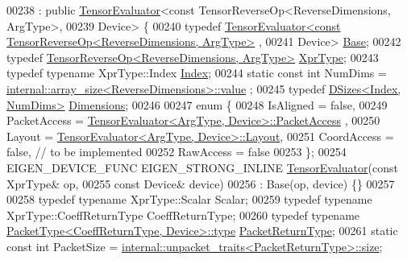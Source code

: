 \begin{DoxyCode}
00238     : \textcolor{keyword}{public} \hyperlink{struct_eigen_1_1_tensor_evaluator}{TensorEvaluator}<const TensorReverseOp<ReverseDimensions, ArgType>,
00239                              Device> \{
00240   \textcolor{keyword}{typedef} \hyperlink{struct_eigen_1_1_tensor_evaluator}{TensorEvaluator<const TensorReverseOp<ReverseDimensions, ArgType>}
      ,
00241                           Device> \hyperlink{struct_eigen_1_1_tensor_evaluator_3_01const_01_tensor_reverse_op_3_01_reverse_dimensions_00_01_arg_type_01_4_00_01_device_01_4}{Base};
00242   \textcolor{keyword}{typedef} \hyperlink{class_eigen_1_1_tensor_reverse_op}{TensorReverseOp<ReverseDimensions, ArgType>} 
      \hyperlink{class_eigen_1_1_tensor_reverse_op}{XprType};
00243   \textcolor{keyword}{typedef} \textcolor{keyword}{typename} XprType::Index \hyperlink{namespace_eigen_a62e77e0933482dafde8fe197d9a2cfde}{Index};
00244   \textcolor{keyword}{static} \textcolor{keyword}{const} \textcolor{keywordtype}{int} NumDims = \hyperlink{struct_eigen_1_1internal_1_1array__size}{internal::array\_size<ReverseDimensions>::value}
      ;
00245   \textcolor{keyword}{typedef} \hyperlink{struct_eigen_1_1_d_sizes}{DSizes<Index, NumDims>} \hyperlink{struct_eigen_1_1_d_sizes}{Dimensions};
00246 
00247   \textcolor{keyword}{enum} \{
00248     IsAligned = \textcolor{keyword}{false},
00249     PacketAccess = \hyperlink{struct_eigen_1_1_tensor_evaluator}{TensorEvaluator<ArgType, Device>::PacketAccess}
      ,
00250     Layout = \hyperlink{struct_eigen_1_1_tensor_evaluator}{TensorEvaluator<ArgType, Device>::Layout},
00251     CoordAccess = \textcolor{keyword}{false},  \textcolor{comment}{// to be implemented}
00252     RawAccess = \textcolor{keyword}{false}
00253   \};
00254   EIGEN\_DEVICE\_FUNC EIGEN\_STRONG\_INLINE \hyperlink{struct_eigen_1_1_tensor_evaluator}{TensorEvaluator}(\textcolor{keyword}{const} XprType& op,
00255                                                         \textcolor{keyword}{const} Device& device)
00256       : Base(op, device) \{\}
00257 
00258   \textcolor{keyword}{typedef} \textcolor{keyword}{typename} XprType::Scalar Scalar;
00259   \textcolor{keyword}{typedef} \textcolor{keyword}{typename} XprType::CoeffReturnType CoeffReturnType;
00260   \textcolor{keyword}{typedef} \textcolor{keyword}{typename} \hyperlink{group___sparse_core___module}{PacketType<CoeffReturnType, Device>::type} 
      \hyperlink{group___sparse_core___module}{PacketReturnType};
00261   \textcolor{keyword}{static} \textcolor{keyword}{const} \textcolor{keywordtype}{int} PacketSize = 
      \hyperlink{struct_eigen_1_1internal_1_1unpacket__traits}{internal::unpacket\_traits<PacketReturnType>::size};

\end{DoxyCode}
